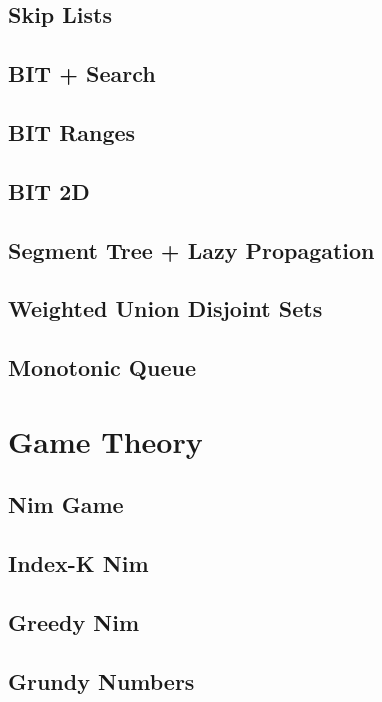		\subsection{Skip Lists}
			
		\subsection{BIT + Search}
			
		\subsection{BIT Ranges}
			
		\subsection{BIT 2D}
			
		\subsection{Segment Tree + Lazy Propagation}
			
		\subsection{Weighted Union Disjoint Sets}
			
		\subsection{Monotonic Queue}
			
	\section{Game Theory}
		\subsection{Nim Game}
			
		\subsection{Index-K Nim}
			
		\subsection{Greedy Nim}
			
		\subsection{Grundy Numbers}
			

